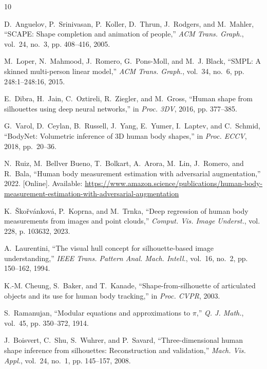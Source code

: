\documentclass[journal]{IEEEtran}
\begin{document}

\begin{thebibliography}{10}

D.~Anguelov, P.~Srinivasan, P.~Koller, D.~Thrun, J.~Rodgers, and M.~Mahler,
  ``{SCAPE}: Shape completion and animation of people,'' \emph{ACM Trans.
  Graph.}, vol.~24, no.~3, pp. 408--416, 2005.

M.~Loper, N.~Mahmood, J.~Romero, G.~Pons-Moll, and M.~J. Black, ``{SMPL}: A
  skinned multi-person linear model,'' \emph{ACM Trans. Graph.}, vol.~34,
  no.~6, pp. 248:1--248:16, 2015.

E.~Dibra, H.~Jain, C.~Oztireli, R.~Ziegler, and M.~Gross, ``Human shape from
  silhouettes using deep neural networks,'' in \emph{Proc. 3DV}, 2016, pp.
  377--385.

G.~Varol, D.~Ceylan, B.~Russell, J.~Yang, E.~Yumer, I.~Laptev, and C.~Schmid,
``BodyNet: Volumetric inference of 3D human body shapes,'' in \emph{Proc. ECCV}, 2018, pp.~20--36.

N.~Ruiz, M.~Bellver Bueno, T.~Bolkart, A.~Arora, M.~Lin, J.~Romero, and R.~Bala,
``Human body measurement estimation with adversarial augmentation,'' 2022.
[Online]. Available: \url{https://www.amazon.science/publications/human-body-measurement-estimation-with-adversarial-augmentation}

K.~\v{S}ko\v{r}v\'{a}nkov\'{a}, P.~Koprna, and M.~Trnka, ``Deep regression of
  human body measurements from images and point clouds,'' \emph{Comput. Vis.
  Image Underst.}, vol. 228, p. 103632, 2023.

A.~Laurentini, ``The visual hull concept for silhouette-based image
  understanding,'' \emph{IEEE Trans. Pattern Anal. Mach. Intell.}, vol.~16,
  no.~2, pp. 150--162, 1994.

K.-M. Cheung, S.~Baker, and T.~Kanade, ``Shape-from-silhouette of articulated
  objects and its use for human body tracking,'' in \emph{Proc. CVPR}, 2003.

S.~Ramanujan, ``Modular equations and approximations to $\pi$,'' \emph{Q. J.
  Math.}, vol.~45, pp. 350--372, 1914.

J.~Boisvert, C.~Shu, S.~Wuhrer, and P.~Savard, ``Three-dimensional human shape
  inference from silhouettes: Reconstruction and validation,'' \emph{Mach.
  Vis. Appl.}, vol.~24, no.~1, pp. 145--157, 2008.


\end{thebibliography}
\end{document}
